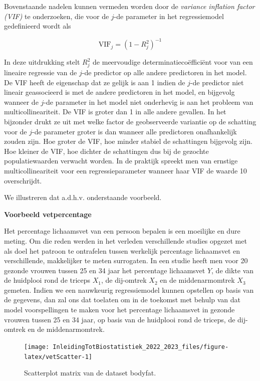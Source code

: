 \documentclass[
  12pt,dutch,coursenotes]{book}
\begin{document}
Bovenstaande nadelen kunnen vermeden worden door de \textit{variance inflation factor (VIF)} te onderzoeken, die voor de \(j\)-de parameter in het regressiemodel gedefinieerd wordt als

\[
\textrm{VIF}_j=\left(1-R_j^2\right)^{-1}
\]

In deze uitdrukking stelt \(R_j^2\) de meervoudige determinatiecoëfficiënt voor van een lineaire regressie van de \(j\)-de predictor op alle andere predictoren in het model. De VIF heeft de eigenschap dat ze gelijk is aan 1 indien de \(j\)-de predictor niet lineair geassocieerd is met de andere predictoren in het model, en bijgevolg wanneer de \(j\)-de parameter in het model niet onderhevig is aan het probleem van multicollineariteit. De VIF is groter dan 1 in alle andere gevallen. In het bijzonder drukt ze uit met welke factor de geobserveerde variantie op de schatting voor de \(j\)-de parameter groter is dan wanneer alle predictoren onafhankelijk zouden zijn. Hoe groter de VIF, hoe minder stabiel de schattingen bijgevolg zijn. Hoe kleiner de VIF, hoe dichter de schattingen dus bij de gezochte populatiewaarden verwacht worden. In de praktijk spreekt men van ernstige multicollineariteit voor een regressieparameter wanneer haar VIF de waarde 10 overschrijdt.

We illustreren dat a.d.h.v. onderstaande voorbeeld.

\textbf{Voorbeeld vetpercentage}

Het percentage lichaamsvet van een persoon bepalen is een moeilijke en dure meting.
Om die reden werden in het verleden verschillende studies opgezet met als doel het patroon te ontrafelen tussen werkelijk percentage lichaamsvet en verschillende, makkelijker te meten surrogaten.
In een studie heeft men voor
20 gezonde vrouwen tussen 25 en 34 jaar het percentage lichaamsvet \(Y\), de dikte van de huidplooi rond de triceps \(X_1\), de dij-omtrek \(X_2\) en de middenarmomtrek \(X_3\) gemeten.
Indien we een nauwkeurig regressiemodel kunnen opstellen op basis van de gegevens, dan zal ons dat toelaten om in de toekomst met behulp van dat model voorspellingen te maken voor het percentage lichaamsvet in gezonde vrouwen tussen 25 en 34 jaar, op basis van de huidplooi rond de triceps, de dij-omtrek en de middenarmomtrek.

\begin{figure}

{\centering \texttt{[image: InleidingTotBiostatistiek\_2022\_2023\_files/figure-latex/vetScatter-1]} 

}

\caption{Scatterplot matrix van de dataset bodyfat.}\label{fig:vetScatter}
\end{figure}
\end{document}

